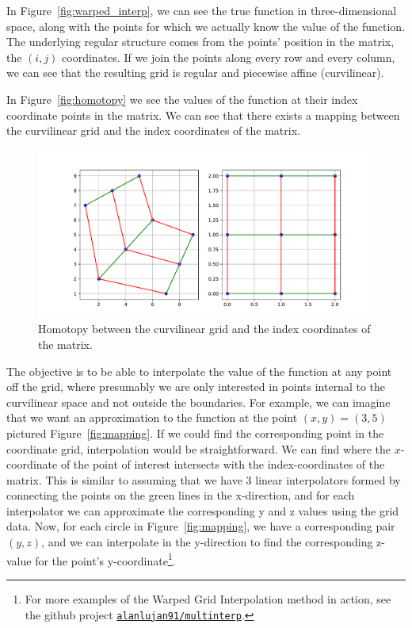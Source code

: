In Figure~\ref{fig:warped_interp}, we can see the true function in three-dimensional space, along with the points for which we actually know the value of the function. The underlying regular structure comes from the points' position in the matrix, the $(i,j)$ coordinates. If we join the points along every row and every column, we can see that the resulting grid is regular and piecewise affine (curvilinear).

In Figure~\ref{fig:homotopy} we see the values of the function at their index coordinate points in the matrix. We can see that there exists a mapping between the curvilinear grid and the index coordinates of the matrix.

\begin{figure}
  \centering
  \includegraphics[width=0.8\linewidth]{Figures/Homotopy.pdf}
  \caption{Homotopy between the curvilinear grid and the index coordinates of the matrix.}
  \notinsubfile{\label{fig:homotopy}}
\end{figure}

The objective is to be able to interpolate the value of the function at any point off the grid, where presumably we are only interested in points internal to the curvilinear space and not outside the boundaries. For example, we can imagine that we want an approximation to the function at the point $(x,y) = (3, 5)$ pictured Figure~\ref{fig:mapping}. If we could find the corresponding point in the coordinate grid, interpolation would be straightforward. We can find where the $x$-coordinate of the point of interest intersects with the index-coordinates of the matrix. This is similar to assuming that we have 3 linear interpolators formed by connecting the points on the green lines in the x-direction, and for each interpolator we can approximate the corresponding y and z values using the grid data. Now, for each circle in Figure~\ref{fig:mapping}, we have a corresponding pair $(y,z)$, and we can interpolate in the y-direction to find the corresponding z-value for the point's y-coordinate\footnote{For more examples of the Warped Grid Interpolation method in action, see the github project \href{https://github.com/alanlujan91/multinterp/blob/main/notebooks/CurvilinearInterpolation.ipynb}{\texttt{alanlujan91/multinterp}}.}.


